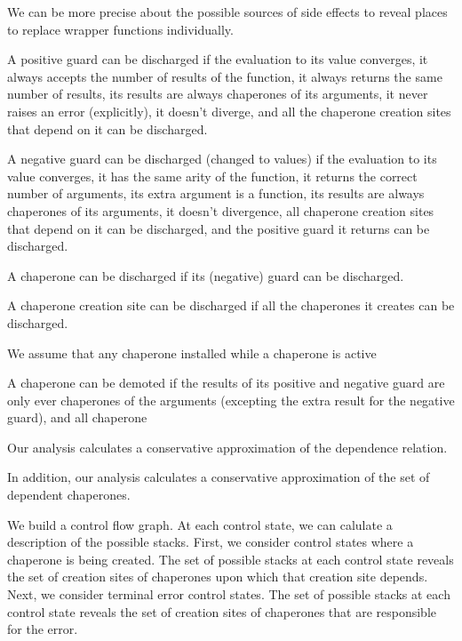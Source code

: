 \documentclass{sigplanconf}
\begin{document}
We can be more precise about the possible sources of side effects to reveal places to replace wrapper functions individually.

A positive guard can be discharged if the evaluation to its value converges, it always accepts the number of results of the function, it always returns the same number of results, its results are always chaperones of its arguments, it never raises an error (explicitly), it doesn't diverge, and all the chaperone creation sites that depend on it can be discharged.

A negative guard can be discharged (changed to values) if the evaluation to its value converges, it has the same arity of the function, it returns the correct number of arguments, its extra argument is a function, its results are always chaperones of its arguments, it doesn't divergence, all chaperone creation sites that depend on it can be discharged, and the positive guard it returns can be discharged.


A chaperone can be discharged if its (negative) guard can be discharged.

A chaperone creation site can be discharged if all the chaperones it creates can be discharged.

We assume that any chaperone installed while a chaperone is active 

A chaperone can be demoted if the results of its positive and negative guard are only ever chaperones of the arguments (excepting the extra result for the negative guard), and all chaperone 

Our analysis calculates a conservative approximation of the dependence relation.

In addition, our analysis calculates a conservative approximation of the set of dependent chaperones.

We build a control flow graph.
At each control state, we can calulate a description of the possible stacks.
First, we consider control states where a chaperone is being created.
The set of possible stacks at each control state reveals the set of creation sites of chaperones upon which that creation site depends.
Next, we consider terminal error control states.
The set of possible stacks at each control state reveals the set of creation sites of chaperones that are responsible for the error.
\end{document}
